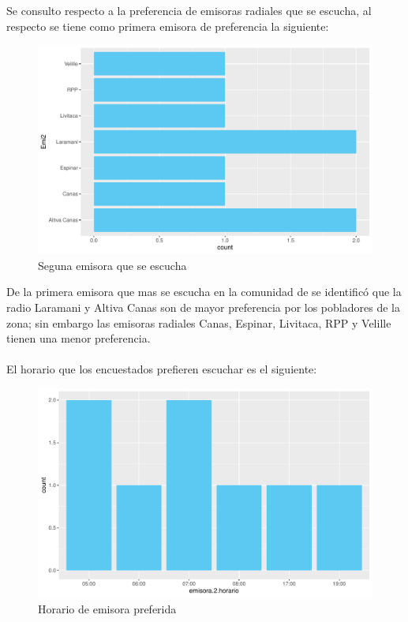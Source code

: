 \documentclass[12pt]{article}\usepackage[]{graphicx}\usepackage[]{xcolor}
\makeatletter
\def\maxwidth{ %
  \ifdim\Gin@nat@width>\linewidth
    \linewidth
  \else
    \Gin@nat@width
  \fi
}
\newenvironment{knitrout}{}{} %
\makeatother
\begin{document}
	Se consulto respecto a la preferencia de emisoras radiales que se escucha, al respecto se tiene como primera emisora de preferencia la siguiente:
	\begin{figure}[H]
	\centering
\begin{knitrout}
\color{fgcolor}
\includegraphics[width=\maxwidth]{figure/four-1} 
\end{knitrout}
	\caption{Seguna emisora que se escucha}
	\end{figure}
	De la primera emisora que mas se escucha en la comunidad de \comunidad se identificó que la radio Laramani y Altiva Canas son de mayor preferencia por los pobladores de la zona; sin embargo las emisoras radiales Canas, Espinar, Livitaca, RPP y Velille tienen una menor preferencia.\\
	\\
	El horario que los encuestados prefieren escuchar es el siguiente:
	\begin{figure}[H]
	\centering
\begin{knitrout}
\color{fgcolor}
\includegraphics[width=\maxwidth]{figure/five-1} 
\end{knitrout}
	\caption{Horario de emisora preferida}
	\end{figure}
\end{document}
